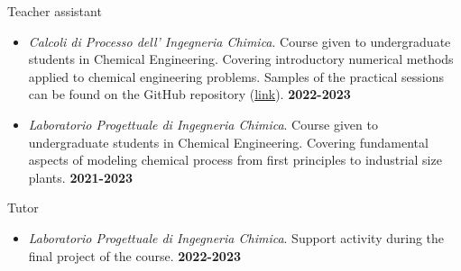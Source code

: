 \begin{position_simple}{Teacher assistant}{\polimi}
\begin{itemize}
    \item[ ] {\it Calcoli di Processo dell' Ingegneria Chimica}. Course given to
       undergraduate students in Chemical Engineering. Covering introductory numerical
       methods applied to chemical engineering problems. Samples of the practical sessions
       can be found on the GitHub repository
       (\href{https://github.com/Titodinelli/Calcoli-di-Processo-dell-Ingegneria-Chimica}{link}).
       \hfill {\bf 2022-2023}

    \item[ ] {\it Laboratorio Progettuale di Ingegneria Chimica}. Course given to undergraduate
        students in Chemical Engineering. Covering fundamental aspects of modeling chemical process
        from first principles to industrial size plants. \hfill {\bf 2021-2023}
\end{itemize}
\end{position_simple}

\begin{position_simple}{Tutor}{\polimi}
\begin{itemize}
    \item[ ] {\it Laboratorio Progettuale di Ingegneria Chimica}. Support activity during the
        final project of the course. \hfill {\bf 2022-2023}
\end{itemize}
\end{position_simple}
